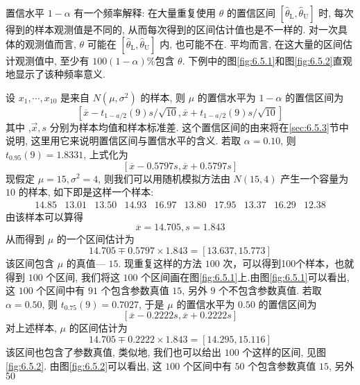 置信水平 $1-\alpha$ 有一个频率解释: 在大量重复使用 $\theta$ 的置信区间  $\left[\hat{\theta}_{\mathrm{L}}, \hat{\theta}_{\mathrm{U}}\right]$
时, 每次得到的样本观测值是不同的, 从而每次得到的区间估计值也是不一样的. 对一次具体的观测值而言, $\theta$ 可能在 $\left[\hat{\theta}_{\mathrm{L}}, \hat{\theta}_{\mathrm{U}}\right]$ 内, 也可能不在. 平均而言, 在这大量的区间估计观测值中, 至少有 $100(1-\alpha)$\%包含 $\theta$. 下例中的图\ref{fig:6.5.1}和图\ref{fig:6.5.2}直观地显示了该种频率意义.

\begin{example}\label{exam:6.5.1}
设 $x_{1}, \cdots, x_{10}$ 是来自 $N\left(\mu, \sigma^{2}\right)$ 的样本, 则 $\mu$ 的置信水平为 $1-\alpha$ 的置信区间为
\[\left[\overline{x}-t_{1-a / 2}(9) s / \sqrt{10}, \overline{x}+t_{1-a / 2}(9) s / \sqrt{10}\right]\]
其中 ,$\vec{x}, s$ 分别为样本均值和样本标准差. 这个置信区间的由来将在\ref{sec:6.5.3}节中说明, 这里用它来说明置信区间与置信水平的含义.
若取 $\alpha=0.10$, 则 $t_{0.95}(9)=1.8331$, 上式化为
\[[\overline{x}-0.5797 s, \overline{x}+0.5797 s]\]
现假定 $\mu=15, \sigma^{2}=4$, 则我们可以用随机模拟方法由 $N(15,4)$ 产生一个容量为 $10$ 的样本, 如下即是这样一个样本:
\[\begin{array}{cccccccccc}
14.85 & 13.01 & 13.50 & 14.93 & 16.97 & 13.80 & 17.95 & 13.37 & 16.29 & 12.38
\end{array}\]
由该样本可以算得
\[\overline{x}=14.705, s=1.843\]
从而得到 $\mu$ 的一个区间估计为
\[14.705 \mp 0.5797 \times 1.843=[13.637,15.773]\]
该区间包含 $\mu$ 的真值--- $15$. 现重复这样的方法 $100$ 次，可以得到100个样本，也就得到 $100$ 个区间, 我们将这 $100$ 个区间画在图\ref{fig:6.5.1}上.由图\ref{fig:6.5.1}可以看出, 这 $100$ 个区间中有 $91$ 个包含参数真值 $15$, 另外 $9$ 个不包含参数真值.
若取 $\alpha=0.50$, 则 $t_{0.75}(9)=0.7027$, 于是 $\mu$ 的置信水平为 $0.50$ 的置信区间为
\[[\overline{x}-0.2222 s, \overline{x}+0.2222 s]\]
对上述样本, $\mu$ 的区间估计为
\[14.705 \mp 0.2222 \times 1.843=[14.295,15.116]\]
该区间也包含了参数真值, 类似地, 我们也可以给出 $100$ 个这样的区间, 见图\ref{fig:6.5.2}. 由图\ref{fig:6.5.2}可以看出, 这 $100$ 个区间中有 $50$ 个包含参数真值 $15$, 另外 $50$
\begin{figure}[htbp]
\centering
{}
\end{figure}
\end{example}
